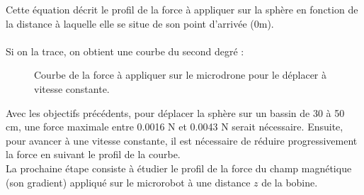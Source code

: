 \documentclass{article}
\begin{document}
Cette équation décrit le profil de la force à appliquer sur la sphère en fonction de la distance à laquelle elle se situe de son point d'arrivée (0m).\\\\Si on la trace, on obtient une courbe du second degré :
\begin{figure}[H]
        \centering
                            \caption{Courbe de la force à appliquer sur le microdrone pour le déplacer à vitesse constante.}
            \label{fig:courbe_force0}
\end{figure}
\noindent
Avec les objectifs précédents, pour déplacer la sphère sur un bassin de 30 à 50 cm, une force maximale entre 0.0016 N et 0.0043 N serait nécessaire. Ensuite, pour avancer à une vitesse constante, il est nécessaire de réduire progressivement la force en suivant le profil de la courbe. 
\\
La prochaine étape consiste à étudier le profil de la force du champ magnétique (son gradient) appliqué sur le microrobot à une distance \( z \) de la bobine.
\\
\\
\end{document}
